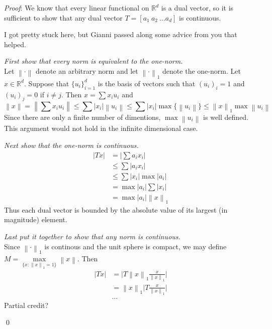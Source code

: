 \documentclass[12pt]{article}
\newcommand{\norm}[1]{\left\lVert#1\right\rVert}
\renewenvironment{proof}{\hspace{-4 ex} \emph{Proof}:}{\qed}
\newcommand{\RR}{\mathbb{R}}
\begin{document}
	\begin{proof}
		We know that every linear functional on $\RR^d$ is a dual vector, so it is sufficient to show that any dual vector $T=[a_1\ a_2\ \dots a_d]$ is continuous. \bigbreak
		
		I got pretty stuck here, but Gianni passed along some advice from you that helped. \bigbreak
		
		\textit{First show that every norm is equivalent to the one-norm.} \\		
		Let $\norm{\cdot}$ denote an arbitrary norm and let $\norm{\cdot}_1$ denote the one-norm. Let $x \in \RR^d$. Suppose that $\{u_i\}_{i=1}^d$ is the basis of vectors such that $(u_i)_i = 1$ and $(u_i)_j = 0$ if $i \neq j$. Then $x = \sum x_i u_i$ and
		$$
		\norm{x} = \norm{\sum x_i u_i} \leq \sum \vert x_i \vert \norm{u_i} \leq \sum \vert x_i \vert \max\{\norm{u_i}\} \leq \norm{x}_1 \max \norm{u_i}
		$$
		Since there are only a finite number of dimentions, $\max \norm{u_i}$ is well defined. This argument would not hold in the infinite dimensional case.

		\bigbreak
		\textit{Next show that the one-norm is continuous.}\\
		\begin{align*}
			\vert Tx \vert & = \Big \vert \sum a_i x_i \Big \vert \\
			& \leq \sum \vert a_i x_i \vert \\
			& \leq \sum \vert x_i \vert \max \vert a_i \vert \\
			& = \max \vert a_i \vert \sum \vert x_i \vert \\
			& = \max \vert a_i \vert \norm{x}_1
		\end{align*}
		Thus each dual vector is bounded by the absolute value of its largest (in magnitude) element.
		
		\bigbreak
		\textit{Last put it together to show that any norm is continuous.} \\
		Since $\norm{\cdot}_1$ is continous and the unit sphere is compact, we may define\\ $M = \max\limits_{ \{x: \norm{x}_1 = 1 \} } \norm{x}$. Then
		\begin{align*}
			\vert Tx \vert & = \vert T \norm{x}_1\frac{x}{\norm{x}_1} \vert \\
				& = \norm{x}_1 \vert T\frac{x}{\norm{x}_1} \vert \\
				& ...
		\end{align*}
		Partial credit?
		
		
	\end{proof}
\end{document}
